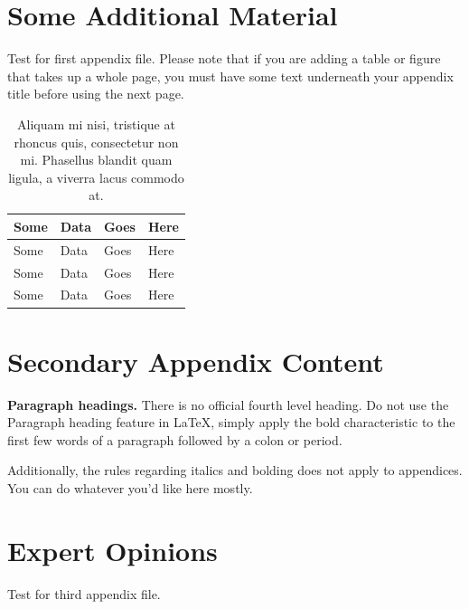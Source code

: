\documentclass[../main.tex]{subfiles}
\begin{document}
\chapter{Some Additional Material}

Test for first appendix file. Please note that if you are adding a table or figure that takes up a whole page, you must have some text underneath your appendix title before using the next page.

\begin{table}[h]
\caption[Aliquam mi nisi]{Aliquam mi nisi, tristique at rhoncus quis, consectetur non mi. Phasellus blandit quam ligula, a viverra lacus commodo at.}
\begin{tabularx}{\textwidth}{XXXX}\hline
Some    & Data  & Goes  & Here\\\hline
Some    & Data  & Goes  & Here\\
Some    & Data  & Goes  & Here\\
Some    & Data  & Goes  & Here\\\hline
\end{tabularx}

\end{table}


\chapter{Secondary Appendix Content}

{\bf Paragraph headings.} There is no official fourth level heading. Do not use the Paragraph heading feature in LaTeX, simply apply the bold characteristic to the first few words of a paragraph followed by a colon or period.

Additionally, the rules regarding italics and bolding does not apply to appendices. You can do whatever you'd like here mostly.


\chapter{Expert Opinions}

Test for third appendix file.
\end{document}
